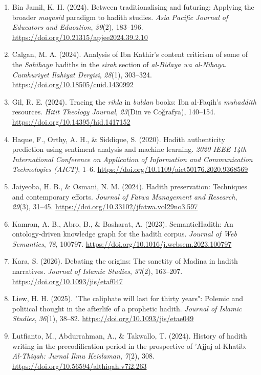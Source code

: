 \begin{enumerate}[leftmargin=1.5cm,itemindent=-1.5cm,label={},itemsep=4pt,parsep=2pt]
    \item Bin Jamil, K. H. (2024). Between traditionalising and futuring: Applying the broader \textit{maqasid} paradigm to hadith studies. \textit{Asia Pacific Journal of Educators and Education}, \textit{39}(2), 183--196. \url{https://doi.org/10.21315/apjee2024.39.2.10}
    \item Calgan, M. A. (2024). Analysis of Ibn Kathir's content criticism of some of the \textit{Sahihayn} hadiths in the \textit{sirah} section of \textit{al-Bidaya wa al-Nihaya}. \textit{Cumhuriyet Ilahiyat Dergisi}, \textit{28}(1), 303--324. \url{https://doi.org/10.18505/cuid.1430992}
    \item Gil, R. E. (2024). Tracing the \textit{rihla} in \textit{buldan} books: Ibn al-Faqih's \textit{muhaddith} resources. \textit{Hitit Theology Journal}, \textit{23}(Din ve Coğrafya), 140--154. \url{https://doi.org/10.14395/hid.1417152}
    \item Haque, F., Orthy, A. H., \& Siddique, S. (2020). Hadith authenticity prediction using sentiment analysis and machine learning. \textit{2020 IEEE 14th International Conference on Application of Information and Communication Technologies (AICT)}, 1--6. \url{https://doi.org/10.1109/aict50176.2020.9368569}
    \item Jaiyeoba, H. B., \& Osmani, N. M. (2024). Hadith preservation: Techniques and contemporary efforts. \textit{Journal of Fatwa Management and Research}, \textit{29}(3), 31--45. \url{https://doi.org/10.33102/jfatwa.vol29no3.597}
    \item Kamran, A. B., Abro, B., \& Basharat, A. (2023). SemanticHadith: An ontology-driven knowledge graph for the hadith corpus. \textit{Journal of Web Semantics}, \textit{78}, 100797. \url{https://doi.org/10.1016/j.websem.2023.100797}
    \item Kara, S. (2026). Debating the origins: The sanctity of Madina in hadith narratives. \textit{Journal of Islamic Studies}, \textit{37}(2), 163--207. \url{https://doi.org/10.1093/jis/etaf047}
    \item Liew, H. H. (2025). "The caliphate will last for thirty years": Polemic and political thought in the afterlife of a prophetic hadith. \textit{Journal of Islamic Studies}, \textit{36}(1), 38--82. \url{https://doi.org/10.1093/jis/etae049}
    \item Lutfianto, M., Abdurrahman, A., \& Takwallo, T. (2024). History of hadith writing in the precodification period in the prospective of 'Ajjaj al-Khatib. \textit{Al-Thiqah: Jurnal Ilmu Keislaman}, \textit{7}(2), 308. \url{https://doi.org/10.56594/althiqah.v7i2.263}

\end{enumerate}
